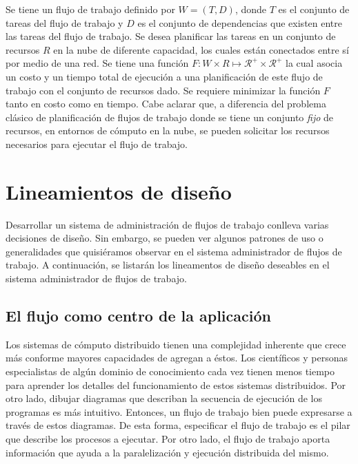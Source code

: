 Se tiene un flujo de trabajo definido por $W = (T, D)$, donde $T$ es el conjunto de tareas del flujo de trabajo y $D$ es el conjunto de dependencias que existen entre las tareas del flujo de trabajo. Se desea planificar las tareas en un conjunto de recursos $R$ en la nube de diferente capacidad, los cuales están conectados entre sí por medio de una red. Se tiene una función $F: W \times R \mapsto \mathcal{R}^{+} \times \mathcal{R}^{+} $ la cual asocia un costo y un tiempo total de ejecución a una planificación de este flujo de trabajo con el conjunto de recursos dado. Se requiere minimizar la función $F$ tanto en costo como en tiempo. Cabe aclarar que, a diferencia del problema clásico de planificación de flujos de trabajo donde se tiene un conjunto \emph{fijo} de recursos, en entornos de c\'omputo en la nube, se pueden solicitar los recursos necesarios para ejecutar el flujo de trabajo.


\section{Lineamientos de diseño}

Desarrollar un sistema de administración de flujos de trabajo conlleva varias decisiones de diseño. Sin embargo, se pueden ver algunos patrones de uso o generalidades que quisiéramos observar en el sistema administrador de flujos de trabajo. A continuación, se listarán los lineamentos de diseño deseables en el sistema administrador de flujos de trabajo.



\subsection{El flujo como centro de la aplicación}

Los sistemas de cómputo distribuido tienen una complejidad inherente que crece más conforme mayores capacidades de agregan a éstos. Los científicos y personas especialistas de algún dominio de conocimiento cada vez tienen menos tiempo para aprender los detalles del funcionamiento de estos sistemas distribuidos. Por otro lado, dibujar diagramas que describan la secuencia de ejecución de los programas es más intuitivo. Entonces, un flujo de trabajo bien puede expresarse a través de estos diagramas. De esta forma, especificar el flujo de trabajo es el pilar que describe los procesos a ejecutar. Por otro lado, el flujo de trabajo aporta información que ayuda a la paralelización y ejecución distribuida del mismo.




